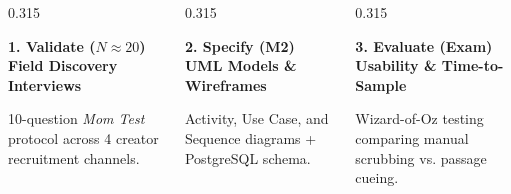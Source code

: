 \begin{frame}[t]

  \begin{columns}[onlytextwidth, T]
    \begin{column}{0.315\textwidth}
      \begin{tcolorbox}[standardcard, top=3.5pt, bottom=3.5pt, left=5pt, right=5pt]
        {\normalsize\bfseries\textcolor{accentemerald}{1. Validate ($N \approx 20$)}}\\[0.4mm]
        {\scriptsize\bfseries\textcolor{textwhite}{Field Discovery Interviews}}\par\vspace{0.8mm}
        {\tiny\textcolor{textmuted}{10-question \textit{Mom Test} protocol across 4 creator recruitment channels.}}
      \end{tcolorbox}
    \end{column}

    \begin{column}{0.315\textwidth}
      \begin{tcolorbox}[standardcard, top=3.5pt, bottom=3.5pt, left=5pt, right=5pt]
        {\normalsize\bfseries\textcolor{textwhite}{2. Specify (M2)}}\\[0.4mm]
        {\scriptsize\bfseries\textcolor{textwhite}{UML Models \& Wireframes}}\par\vspace{0.8mm}
        {\tiny\textcolor{textmuted}{Activity, Use Case, and Sequence diagrams + PostgreSQL schema.}}
      \end{tcolorbox}
    \end{column}

    \begin{column}{0.315\textwidth}
      \begin{tcolorbox}[standardcard, top=3.5pt, bottom=3.5pt, left=5pt, right=5pt]
        {\normalsize\bfseries\textcolor{textwhite}{3. Evaluate (Exam)}}\\[0.4mm]
        {\scriptsize\bfseries\textcolor{textwhite}{Usability \& Time-to-Sample}}\par\vspace{0.8mm}
        {\tiny\textcolor{textmuted}{Wizard-of-Oz testing comparing manual scrubbing vs. passage cueing.}}
      \end{tcolorbox}
    \end{column}
  \end{columns}


\end{frame}
